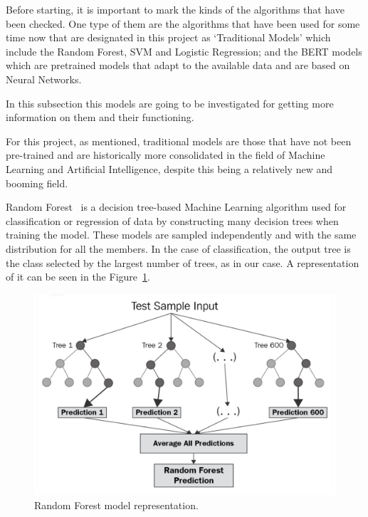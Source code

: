 Before starting, it is important to mark the kinds of the algorithms that have been checked. One type of them are the algorithms that have been used for some time now that are designated in this project as `Traditional Models' which include the Random Forest, SVM and Logistic Regression; and the BERT models which are pretrained models that adapt to the available data and are based on Neural Networks.

In this subsection this models are going to be investigated for getting more information on them and their functioning.

For this project, as mentioned, traditional models are those that have not been pre-trained and are historically more consolidated in the field of Machine Learning and Artificial Intelligence, despite this being a relatively new and booming field.

Random Forest~\cite{breiman2001random} is a decision tree-based Machine Learning algorithm used for classification or regression of data by constructing many decision trees when training the model. These models are sampled independently and with the same distribution for all the members. In the case of classification, the output tree is the class selected by the largest number of trees, as in our case. A representation of it can be seen in the Figure~\ref{fig:random-forest}.

\begin{figure}[!htp]
    \centering
    \includegraphics[scale=0.28]{img/detection/random-forest.jpg}
    \caption{Random Forest model representation.}
    \label{fig:random-forest}
\end{figure}

